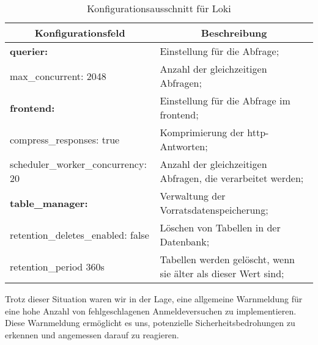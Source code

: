 \begin{table}[H]
  \begin{tabularx}{\textwidth}{|b{7cm}|X|}
  \hline
  \multicolumn{1}{|c|}{\textbf{Konfigurationsfeld}} & \multicolumn{1}{|c|}{\textbf{Beschreibung}} \\ \hline
  \textbf{querier:} & Einstellung für die Abfrage; \\ 
  \hphantom{10}max\_concurrent: 2048 & Anzahl der gleichzeitigen Abfragen;\\ \hline
  \textbf{frontend:} & Einstellung für die Abfrage im \gls{frontend};\\
  \hphantom{10}compress\_responses: true &Komprimierung der \gls{http}-Antworten;\\
  \hphantom{10}scheduler\_worker\_concurrency: 20 &  Anzahl der gleichzeitigen Abfragen, die verarbeitet werden; \\  \hline
  \textbf{table\_manager:} & Verwaltung der Vorratsdatenspeicherung;\\ 
  \hphantom{10}retention\_deletes\_enabled: false & Löschen von Tabellen in der Datenbank;\\ 
  \hphantom{10}retention\_period 360s & Tabellen werden gelöscht, wenn sie älter als dieser Wert sind;\\ \hline
  \end{tabularx}
  \caption[Konfigurationsausschnitt für Loki]
  {Konfigurationsausschnitt für Loki}
  \label{tab:KonfigLoki}
\end{table}

Trotz dieser Situation waren wir in der Lage, eine allgemeine Warnmeldung für eine hohe Anzahl von fehlgeschlagenen Anmeldeversuchen zu implementieren. Diese Warnmeldung ermöglicht es uns, potenzielle Sicherheitsbedrohungen zu erkennen und angemessen darauf zu reagieren.





